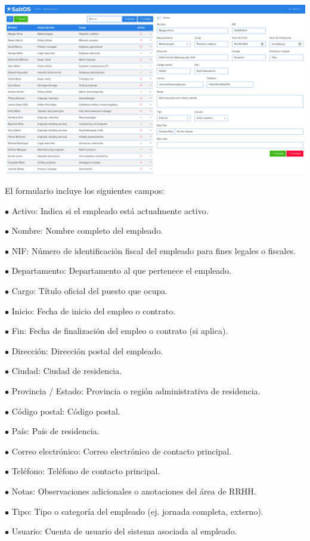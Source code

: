 \documentclass[a4paper]{article}
\begin{document}
\begin{center}\includegraphics[width=1\textwidth]{../ujest/snaps/test-screenshots-js-screenshots-hr-employees-edit-100-es-es-1-snap.png}\end{center}

El formulario incluye los siguientes campos:

\begin{compactitem}
\item[\color{myblue}$\bullet$] Activo: Indica si el empleado está actualmente activo.
\item[\color{myblue}$\bullet$] Nombre: Nombre completo del empleado.
\item[\color{myblue}$\bullet$] NIF: Número de identificación fiscal del empleado para fines legales o fiscales.
\item[\color{myblue}$\bullet$] Departamento: Departamento al que pertenece el empleado.
\item[\color{myblue}$\bullet$] Cargo: Título oficial del puesto que ocupa.
\item[\color{myblue}$\bullet$] Inicio: Fecha de inicio del empleo o contrato.
\item[\color{myblue}$\bullet$] Fin: Fecha de finalización del empleo o contrato (si aplica).
\item[\color{myblue}$\bullet$] Dirección: Dirección postal del empleado.
\item[\color{myblue}$\bullet$] Ciudad: Ciudad de residencia.
\item[\color{myblue}$\bullet$] Provincia / Estado: Provincia o región administrativa de residencia.
\item[\color{myblue}$\bullet$] Código postal: Código postal.
\item[\color{myblue}$\bullet$] País: País de residencia.
\item[\color{myblue}$\bullet$] Correo electrónico: Correo electrónico de contacto principal.
\item[\color{myblue}$\bullet$] Teléfono: Teléfono de contacto principal.
\item[\color{myblue}$\bullet$] Notas: Observaciones adicionales o anotaciones del área de RRHH.
\item[\color{myblue}$\bullet$] Tipo: Tipo o categoría del empleado (ej. jornada completa, externo).
\item[\color{myblue}$\bullet$] Usuario: Cuenta de usuario del sistema asociada al empleado.
\end{compactitem}
\end{document}
